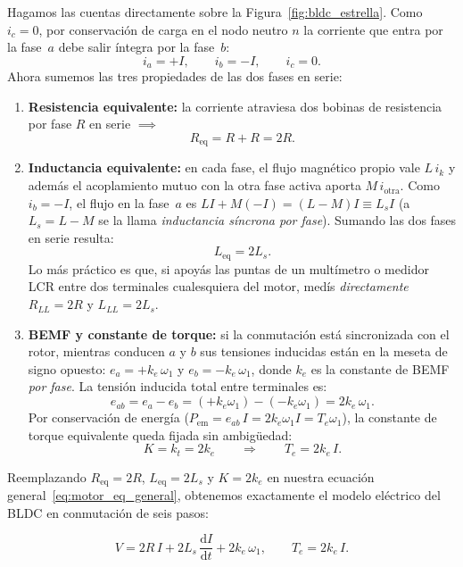 \documentclass[11pt,a4paper,oneside]{book}
\newcommand{\dd}{\mathrm{d}}
\begin{document}
Hagamos las cuentas directamente sobre la Figura~\ref{fig:bldc_estrella}. Como
$i_c = 0$, por conservación de carga en el nodo neutro $n$ la corriente que
entra por la fase~$a$ debe salir íntegra por la fase~$b$:
\[
  i_a = +I, \qquad i_b = -I, \qquad i_c = 0.
\]
Ahora sumemos las tres propiedades de las dos fases en serie:
\begin{enumerate}
  \item \textbf{Resistencia equivalente:} la corriente atraviesa dos bobinas de
        resistencia por fase $R$ en serie $\implies$
        \[
          R_{\text{eq}} = R + R = 2R.
        \]
  \item \textbf{Inductancia equivalente:} en cada fase, el flujo magnético
        propio vale $L\,i_k$ y además el acoplamiento mutuo con la otra fase
        activa aporta $M\,i_{\text{otra}}$. Como $i_b = -I$, el flujo en la
        fase~$a$ es $L I + M(-I) = (L - M)I \equiv L_s I$ (a $L_s = L - M$ se la
        llama \emph{inductancia síncrona por fase}). Sumando las dos fases en
        serie resulta:
        \[
          L_{\text{eq}} = 2 L_s.
        \]
        Lo más práctico es que, si apoyás las puntas de un multímetro o medidor
        LCR entre dos terminales cualesquiera del motor, medís \emph{directamente}
        $R_{LL} = 2R$ y $L_{LL} = 2L_s$.
  \item \textbf{BEMF y constante de torque:} si la conmutación está sincronizada
        con el rotor, mientras conducen $a$ y $b$ sus tensiones inducidas están
        en la meseta de signo opuesto: $e_a = +k_e\,\omega_1$ y
        $e_b = -k_e\,\omega_1$, donde $k_e$ es la constante de BEMF \emph{por
        fase}. La tensión inducida total entre terminales es:
        \[
          e_{ab} = e_a - e_b = (+k_e\omega_1) - (-k_e\omega_1) = 2k_e\,\omega_1.
        \]
        Por conservación de energía ($P_{\text{em}} = e_{ab}\,I = 2k_e\omega_1 I = T_e\omega_1$),
        la constante de torque equivalente queda fijada sin ambigüedad:
        \[
          K = k_t = 2k_e \qquad\Longrightarrow\qquad T_e = 2k_e\,I.
        \]
\end{enumerate}

Reemplazando $R_{\text{eq}}=2R$, $L_{\text{eq}}=2L_s$ y $K=2k_e$ en nuestra
ecuación general~\eqref{eq:motor_eq_general}, obtenemos exactamente el modelo
eléctrico del BLDC en conmutación de seis pasos:
\begin{ecuacionclave}
\begin{equation}
  V = 2R\,I + 2L_s\,\frac{\dd I}{\dd t} + 2k_e\,\omega_1,
  \qquad
  T_e = 2k_e\,I.
  \label{eq:bldc_sixstep}
\end{equation}
\end{ecuacionclave}
\end{document}
